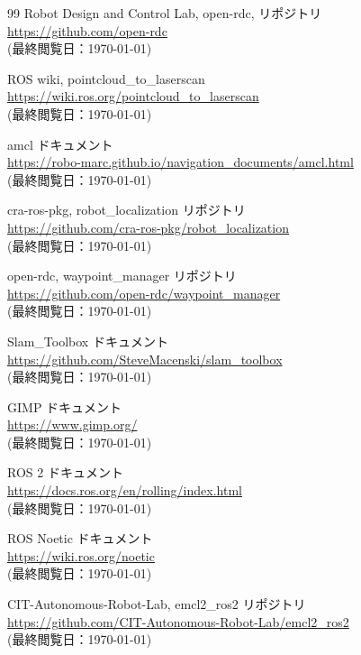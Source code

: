 \documentclass[uplatex, twocolumn, 9pt]{jsproceedings}
\begin{document}
\begin{thebibliography}{99}
Robot Design and Control Lab, open-rdc, リポジトリ\\
\url{https://github.com/open-rdc}\\
(最終閲覧日：\today)

ROS wiki, pointcloud\_to\_laserscan\\
\url{https://wiki.ros.org/pointcloud_to_laserscan}\\
(最終閲覧日：\today)

amcl ドキュメント\\
\url{https://robo-marc.github.io/navigation_documents/amcl.html}\\
(最終閲覧日：\today)


cra-ros-pkg, robot\_localization リポジトリ\\
\url{https://github.com/cra-ros-pkg/robot_localization}\\
(最終閲覧日：\today)

open-rdc, waypoint\_manager リポジトリ\\
\url{https://github.com/open-rdc/waypoint_manager}\\
(最終閲覧日：\today)

Slam\_Toolbox ドキュメント\\
\url{https://github.com/SteveMacenski/slam_toolbox}\\
(最終閲覧日：\today)


GIMP ドキュメント\\
\url{https://www.gimp.org/}\\
(最終閲覧日：\today)


ROS 2 ドキュメント\\
\url{https://docs.ros.org/en/rolling/index.html}\\
(最終閲覧日：\today)

ROS Noetic ドキュメント\\
\url{https://wiki.ros.org/noetic}\\
(最終閲覧日：\today)

CIT-Autonomous-Robot-Lab, emcl2\_ros2 リポジトリ\\
\url{https://github.com/CIT-Autonomous-Robot-Lab/emcl2_ros2}\\
(最終閲覧日：\today)


\end{thebibliography}
\end{document}
